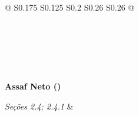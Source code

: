 \begin{longtable}{
    @{}
    S{0.175\SinteseLargura}
    S{0.125\SinteseLargura}
    S{0.2\SinteseLargura}
    S{0.26\SinteseLargura}
    S{0.26\SinteseLargura}
    @{}
}

\caption{Síntese temática da fundamentação e dos estudos relacionados}\label{tab:sintese_referencial}\\

\toprule[1.6pt]

\SinteseCabecalho

\midrule[0.5pt]

\endfirsthead

\\[1mm]

\toprule[1.6pt]

\SinteseCabecalho

\midrule[0.5pt]

\endhead

\endfoot

\bottomrule[1pt]
\\
\endlastfoot

\textbf{Assaf Neto (\citeyear{assaf2014financas})}\par {\normalfont\itshape Seções 2.4; 2.4.1} &


\end{longtable}
